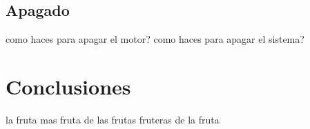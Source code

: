 \documentclass[a4paper]{article}
\begin{document}

\subsection{Apagado} %
\label{sub:apagado}

como haces para apagar el motor? como haces para apagar el sistema?




\section{Conclusiones} %
\label{sec:conclusiones}

la fruta mas fruta de las frutas fruteras de la fruta









 
\end{document}

